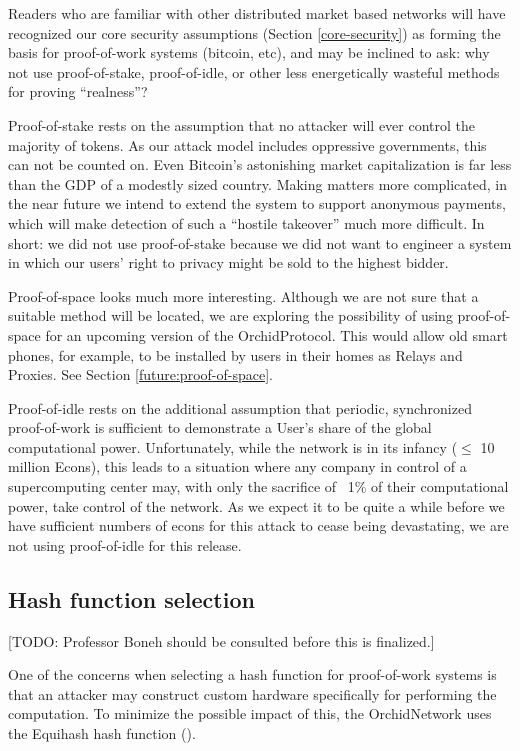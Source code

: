 \documentclass{article}
\newcommand{\orchid}{Orchid}
\newcommand{\Orchid}{\orchid}
\begin{document}
Readers who are familiar with other distributed market based networks will have recognized our core security assumptions (Section \ref{core-security}) as forming the basis for proof-of-work systems (bitcoin, etc), and may be inclined to ask: why not use proof-of-stake, proof-of-idle, or other less energetically wasteful methods for proving “realness”?

Proof-of-stake rests on the assumption that no attacker will ever control the majority of tokens. As our attack model includes oppressive governments, this can not be counted on. Even Bitcoin’s astonishing market capitalization is far less than the GDP of a modestly sized country. Making matters more complicated, in the near future we intend to extend the system to support anonymous payments, which will make detection of such a ``hostile takeover'' much more difficult. In short: we did not use proof-of-stake because we did not want to engineer a system in which our users’ right to privacy might be sold to the highest bidder.

Proof-of-space looks much more interesting. Although we are not sure that a suitable method will be located, we are exploring the possibility of using proof-of-space for an upcoming version of the \Orchid Protocol. This would allow old smart phones, for example, to be installed by users in their homes as Relays and Proxies. See Section \ref{future:proof-of-space}.

Proof-of-idle rests on the additional assumption that periodic, synchronized proof-of-work is sufficient to demonstrate a User’s share of the global computational power. Unfortunately, while the network is in its infancy ($\leq$ 10 million Econs), this leads to a situation where any company in control of a supercomputing center may, with only the sacrifice of ~1\% of their computational power, take control of the network. As we expect it to be quite a while before we have sufficient numbers of econs for this attack to cease being devastating, we are not using proof-of-idle for this release.

\subsection{Hash function selection}

[TODO: Professor Boneh should be consulted before this is finalized.]

One of the concerns when selecting a hash function for proof-of-work
systems is that an attacker may construct custom hardware specifically
for performing the computation. To minimize the possible impact of
this, the \Orchid Network uses the Equihash hash function
(\cite{Equihash}).
\end{document}
